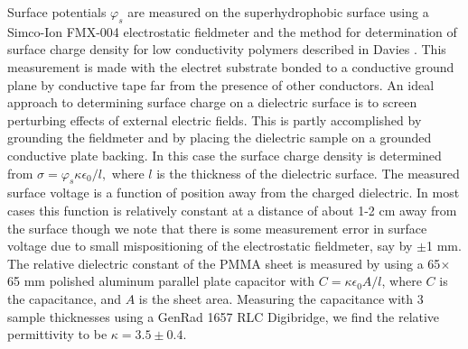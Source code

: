 \documentclass[12pt,a4paper,oneside]{book}
\begin{document}
Surface potentials $\varphi_s$ are measured on the superhydrophobic surface using a Simco-Ion FMX-004 electrostatic fieldmeter and the method for determination of surface charge density for low conductivity polymers described in Davies \cite{davies_examination_1967}. This measurement is made with the electret substrate bonded to a conductive ground plane by conductive tape far from the presence of other conductors. An ideal approach to determining surface charge on a dielectric surface is to screen perturbing effects of external electric fields. This is partly accomplished by grounding the fieldmeter and by placing the dielectric sample on a grounded conductive plate backing. In this case the surface charge density is determined from $\sigma = \varphi_s \kappa \epsilon_0/l,$ where $l$ is the thickness of the dielectric surface. The measured surface voltage is a function of position away from the charged dielectric. In most cases this function is relatively constant at a distance of about 1-2 cm away from the surface though we note that there is some measurement error in surface voltage due to small mispositioning of the electrostatic fieldmeter, say by $\pm$1 mm. The relative dielectric constant of the PMMA sheet is measured by using a 65$\times$65 mm polished aluminum parallel plate capacitor with $C = \kappa \epsilon_0 A/l$, where $C$ is the capacitance, and $A$ is the sheet area. Measuring the capacitance with 3 sample thicknesses using a GenRad 1657 RLC Digibridge, we find the relative permittivity to be $\kappa = 3.5 \pm 0.4$.  
\end{document}
